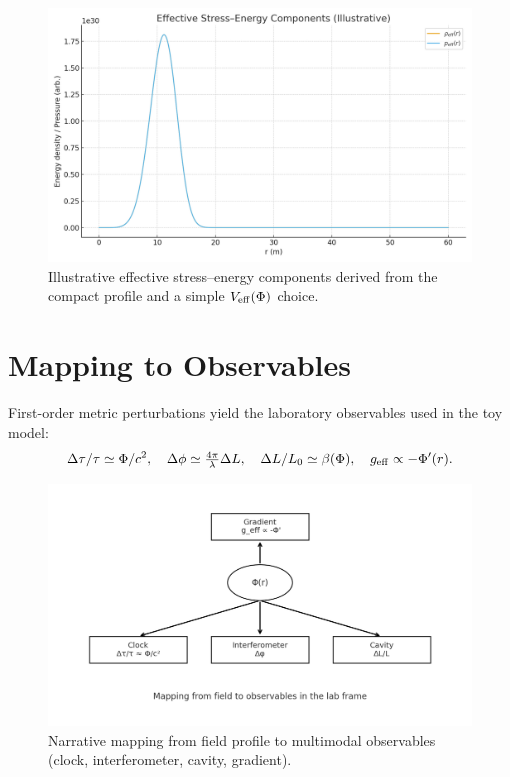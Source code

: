 \documentclass[12pt]{article}
\begin{document}
\begin{figure}[h]
  \centering
  \includegraphics[width=\linewidth]{figures/fig_stress_energy.png}
  \caption{Illustrative effective stress--energy components derived from the compact profile and a simple $V_{\rm eff}(\Phi)$ choice.}
\end{figure}

\section{Mapping to Observables}
First-order metric perturbations yield the laboratory observables used in the toy model:
\begin{align}
\Delta\tau/\tau \simeq \Phi/c^2,\quad
\Delta\phi \simeq \tfrac{4\pi}{\lambda}\Delta L,\quad
\Delta L/L_0 \simeq \beta(\Phi),\quad
g_{\rm eff}\propto -\Phi'(r).
\end{align}

\begin{figure}[h]
  \centering
  \includegraphics[width=\linewidth]{figures/fig_observable_mapping.png}
  \caption{Narrative mapping from field profile to multimodal observables (clock, interferometer, cavity, gradient).}
\end{figure}
\end{document}
